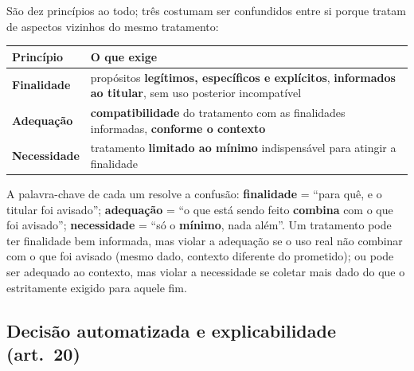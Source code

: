 \begin{conceito}
São dez princípios ao todo; três costumam ser confundidos entre si porque
tratam de aspectos vizinhos do mesmo tratamento:

\begin{center}
\begin{tabular}{@{}p{2.4cm}p{9cm}@{}}
\toprule
\textbf{Princípio} & \textbf{O que exige} \\
\midrule
\textbf{Finalidade} & propósitos \textbf{legítimos, específicos e
explícitos}, \textbf{informados ao titular}, sem uso posterior
incompatível \\
\textbf{Adequação} & \textbf{compatibilidade} do tratamento com as
finalidades informadas, \textbf{conforme o contexto} \\
\textbf{Necessidade} & tratamento \textbf{limitado ao mínimo}
indispensável para atingir a finalidade \\
\bottomrule
\end{tabular}
\end{center}

A palavra-chave de cada um resolve a confusão: \textbf{finalidade} =
“para quê, e o titular foi avisado”; \textbf{adequação} = “o que está
sendo feito \textbf{combina} com o que foi avisado”; \textbf{necessidade}
= “só o \textbf{mínimo}, nada além”. Um tratamento pode ter finalidade bem
informada, mas violar a adequação se o uso real não combinar com o que
foi avisado (mesmo dado, contexto diferente do prometido); ou pode ser
adequado ao contexto, mas violar a necessidade se coletar mais dado do que
o estritamente exigido para aquele fim.
\end{conceito}

\subsection{Decisão automatizada e explicabilidade (art.\ 20)}

